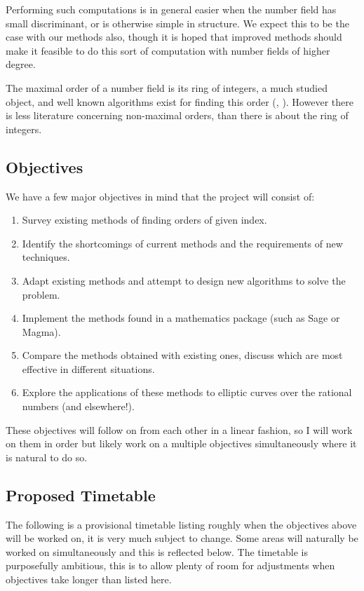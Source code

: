 \documentclass[11pt,a4paper]{article}
\begin{document}
Performing such computations is in general easier when the number field has
small discriminant, or is otherwise simple in structure.
We expect this to be the case with our methods also, though it is hoped that
improved methods should make it feasible to do this sort of computation with
number fields of higher degree.


The maximal order of a number field is its ring of integers, a much studied 
object, and well known algorithms exist for finding this order 
(\cite{pohzas}, \cite{cohen93}).
However there is less literature concerning non-maximal orders, than there 
is about the ring of integers.

\subsection*{Objectives}
We have a few major objectives in mind that the project will consist of:
\begin{enumerate}
\item Survey existing methods of finding orders of given index.
\item Identify the shortcomings of current methods and the requirements of new
techniques.
\item Adapt existing methods and attempt to design new algorithms to solve the
problem.
\item Implement the methods found in a mathematics package (such as Sage or
Magma).
\item Compare the methods obtained with existing ones, discuss which are most
effective in different situations.
\item Explore the applications of these methods to elliptic curves over the 
rational numbers (and elsewhere!).
\end{enumerate}

These objectives will follow on from each other in a linear fashion, 
so I will work on them in order but likely work on a multiple objectives 
simultaneously where it is natural to do so.

\subsection*{Proposed Timetable}
The following is a provisional timetable listing roughly when the objectives
above will be worked on, it is very much subject to change.
Some areas will naturally be worked on simultaneously and this is reflected 
below.
The timetable is purposefully ambitious, this is to allow plenty of room for 
adjustments when objectives take longer than listed here.
\end{document}
